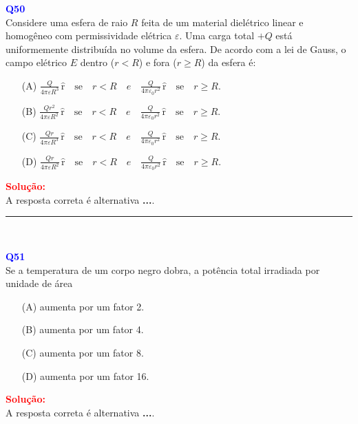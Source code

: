 \documentclass[a4paper,12pt]{article}
\begin{document}
\begin{flushleft}
\textbf{\textcolor{blue}{\Large Q50}}\\
\noindent
Considere uma esfera de raio \( R \) feita de um material dielétrico linear e homogêneo com permissividade elétrica \( \varepsilon \).  
Uma carga total \( +Q \) está uniformemente distribuída no volume da esfera. De acordo com a lei de Gauss, o campo elétrico \( E \) 
dentro (\( r < R \)) e fora (\( r \geq R \)) da esfera é:


\begin{itemize}
\item[(A)] $\frac{Q}{4\pi\varepsilon R^3} \, \hat{\textrm{r}} \quad \text{se} \quad r < R \quad e \quad \frac{Q}{4\pi\varepsilon_0 r^2} \, \hat{\textrm{r}} \quad \text{se} \quad r \geq R. $
\item[(B)] $\frac{Q r^2}{4\pi\varepsilon R^2} \, \hat{\textrm{r}} \quad \text{se} \quad r < R \quad e \quad \frac{Q}{4\pi\varepsilon_0 r^2} \, \hat{\textrm{r}}  \quad \text{se} \quad r \geq R.$
\item[(C)] $\frac{Q r}{4\pi\varepsilon R^3} \, \hat{\textrm{r}} \quad \text{se} \quad r < R \quad e \quad \frac{Q}{4\pi\varepsilon_0 r^2} \, \hat{\textrm{r}} \quad \text{se} \quad r \geq R.$
\item[(D)] $\frac{Q r}{4\pi\varepsilon R^2} \, \hat{\textrm{r}} \quad \text{se} \quad r < R \quad e \quad \frac{Q}{4\pi\varepsilon_0 r^2} \, \hat{\textrm{r}} \quad \text{se} \quad r \geq R.$
\end{itemize}

\vspace{0.5cm}

\textcolor{red}{\textbf{Solução:}}\\

A resposta correta é alternativa \colorbox{green!50}{\textbf{...}}.
\end{flushleft}

\noindent\rule{\linewidth}{0.6pt}\\

\begin{flushleft}
\textbf{\textcolor{blue}{\Large Q51}}\\
\noindent
Se a temperatura de um corpo negro dobra, a potência total
irradiada por unidade de área

\begin{itemize}
\item[(A)] aumenta por um fator 2.
\item[(B)] aumenta por um fator 4.
\item[(C)] aumenta por um fator 8.
\item[(D)] aumenta por um fator 16.
\end{itemize}

\vspace{0.5cm}

\textcolor{red}{\textbf{Solução:}}\\


A resposta correta é alternativa \colorbox{green!50}{\textbf{...}}.
\end{flushleft}
\end{document}
